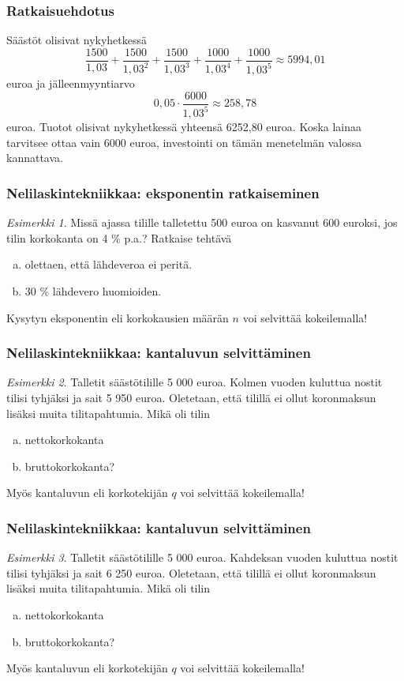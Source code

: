 \documentclass{beamer}\usepackage[]{graphicx}\usepackage[]{color}
\theoremstyle{remark}
\newtheorem{esim}{Esimerkki}
\begin{document}
\begin{frame}
  \frametitle{Ratkaisuehdotus}
        Säästöt olisivat nykyhetkessä
        \[
            \frac{1500}{1,03} + \frac{1500}{1,03^2} + \frac{1500}{1,03^3} + \frac{1000}{1,03^4} + \frac{1000}{1,03^5}\approx 5994,01
       \]
       euroa ja jälleenmyyntiarvo
       \[
            0,05\cdot\frac{6000}{1,03^5}\approx 258,78
       \]
       euroa. Tuotot olisivat nykyhetkessä yhteensä 6252,80 euroa. Koska lainaa tarvitsee ottaa vain 6000 euroa,
       investointi on tämän menetelmän valossa kannattava.
\end{frame}

\begin{frame}
    \frametitle{Nelilaskintekniikkaa: eksponentin ratkaiseminen}
    \pause
    \begin{esim}
        Missä ajassa tilille talletettu 500 euroa on kasvanut 600 euroksi, jos tilin korkokanta on 4 \% p.a.?
        Ratkaise tehtävä
        \begin{enumerate}[(a)]
            \item olettaen, että lähdeveroa ei peritä.
            \item 30 \% lähdevero huomioiden.
        \end{enumerate}
    \end{esim}
    \pause
    Kysytyn eksponentin  eli korkokausien määrän $n$ voi selvittää kokeilemalla!
\end{frame}

\begin{frame}
    \frametitle{Nelilaskintekniikkaa: kantaluvun selvittäminen}
    \begin{esim}
        Talletit säästötilille 5 000 euroa. Kolmen vuoden kuluttua nostit tilisi tyhjäksi ja sait 5 950 euroa.
        Oletetaan, että tilillä ei ollut koronmaksun lisäksi muita tilitapahtumia. Mikä oli tilin
        \begin{enumerate}[(a)]
            \item nettokorkokanta
            \item bruttokorkokanta?
        \end{enumerate}
    \end{esim}
    \pause
    Myös kantaluvun eli korkotekijän $q$ voi selvittää kokeilemalla!
\end{frame}

\begin{frame}
    \frametitle{Nelilaskintekniikkaa: kantaluvun selvittäminen}
    \begin{esim}
        Talletit säästötilille 5 000 euroa. Kahdeksan vuoden kuluttua nostit tilisi tyhjäksi ja sait 6 250 euroa.
        Oletetaan, että tilillä ei ollut koronmaksun lisäksi muita tilitapahtumia. Mikä oli tilin
        \begin{enumerate}[(a)]
            \item nettokorkokanta
            \item bruttokorkokanta?
        \end{enumerate}
    \end{esim}
    \pause
    Myös kantaluvun eli korkotekijän $q$ voi selvittää kokeilemalla!
\end{frame}
\end{document}
